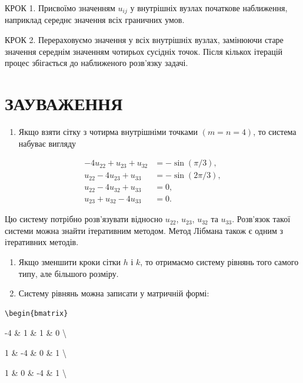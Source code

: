 \documentclass[
  ukrainian,
]{article}
\providecommand{\tightlist}{%
  \setlength{\itemsep}{0pt}\setlength{\parskip}{0pt}}
\begin{document}
КРОК 1. Присвоїмо значенням \(u_{ij}\) у внутрішніх вузлах початкове
наближення, наприклад середнє значення всіх граничних умов.

КРОК 2. Перераховуємо значення у всіх внутрішніх вузлах, замінюючи старе
значення середнім значенням чотирьох сусідніх точок. Після кількох
ітерацій процес збігається до наближеного розв'язку задачі.

\section{ЗАУВАЖЕННЯ}\label{ux437ux430ux443ux432ux430ux436ux435ux43dux43dux44f}

\begin{enumerate}
\def\labelenumi{\arabic{enumi}.}
\tightlist
\item
  Якщо взяти сітку з чотирма внутрішніми точками \((m=n=4)\), то система
  набуває вигляду
\end{enumerate}

\[
\begin{aligned}
-4u_{22} + u_{23} + u_{32} &= -\sin(\pi/3),\\
u_{22} - 4u_{23} + u_{33} &= -\sin(2\pi/3),\\
u_{22} - 4u_{32} + u_{33} &= 0,\\
u_{23} + u_{32} - 4u_{33} &= 0.
\end{aligned}
\]

Цю систему потрібно розв'язувати відносно \(u_{22}\), \(u_{23}\),
\(u_{32}\) та \(u_{33}\). Розв'язок такої системи можна знайти
ітеративним методом. Метод Лібмана також є одним з ітеративних методів.

\begin{enumerate}
\def\labelenumi{\arabic{enumi}.}
\setcounter{enumi}{1}
\item
  Якщо зменшити кроки сітки \(h\) і \(k\), то отримаємо систему рівнянь
  того самого типу, але більшого розміру.
\item
  Систему рівнянь можна записати у матричній формі:
\end{enumerate}

\begin{verbatim}
\begin{bmatrix}
\end{verbatim}

-4 \& 1 \& 1 \& 0 \textbackslash{}

1 \& -4 \& 0 \& 1 \textbackslash{}

1 \& 0 \& -4 \& 1 \textbackslash{}
\end{document}
